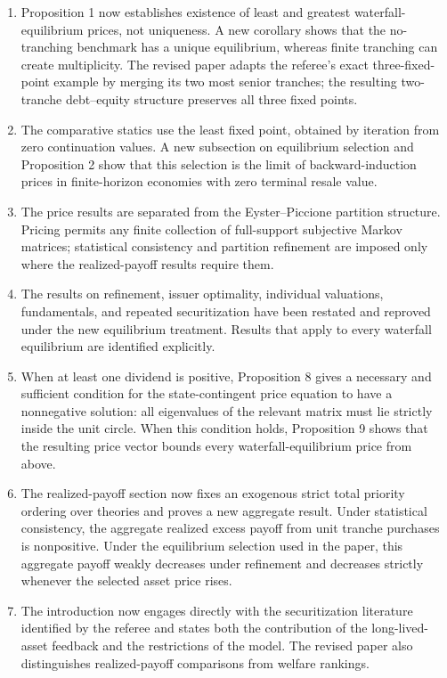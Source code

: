 \documentclass[11pt]{article}
\begin{document}
\begin{enumerate}[leftmargin=2em]
\item Proposition 1 now establishes existence of least and greatest waterfall-equilibrium prices, not uniqueness. A new corollary shows that the no-tranching benchmark has a unique equilibrium, whereas finite tranching can create multiplicity. The revised paper adapts the referee's exact three-fixed-point example by merging its two most senior tranches; the resulting two-tranche debt--equity structure preserves all three fixed points.
\item The comparative statics use the least fixed point, obtained by iteration from zero continuation values. A new subsection on equilibrium selection and Proposition 2 show that this selection is the limit of backward-induction prices in finite-horizon economies with zero terminal resale value.
\item The price results are separated from the Eyster--Piccione partition structure. Pricing permits any finite collection of full-support subjective Markov matrices; statistical consistency and partition refinement are imposed only where the realized-payoff results require them.
\item The results on refinement, issuer optimality, individual valuations, fundamentals, and repeated securitization have been restated and reproved under the new equilibrium treatment. Results that apply to every waterfall equilibrium are identified explicitly.
\item When at least one dividend is positive, Proposition 8 gives a necessary and sufficient condition for the state-contingent price equation to have a nonnegative solution: all eigenvalues of the relevant matrix must lie strictly inside the unit circle. When this condition holds, Proposition 9 shows that the resulting price vector bounds every waterfall-equilibrium price from above.
\item The realized-payoff section now fixes an exogenous strict total priority ordering over theories and proves a new aggregate result. Under statistical consistency, the aggregate realized excess payoff from unit tranche purchases is nonpositive. Under the equilibrium selection used in the paper, this aggregate payoff weakly decreases under refinement and decreases strictly whenever the selected asset price rises.
\item The introduction now engages directly with the securitization literature identified by the referee and states both the contribution of the long-lived-asset feedback and the restrictions of the model. The revised paper also distinguishes realized-payoff comparisons from welfare rankings.
\end{enumerate}
\end{document}
